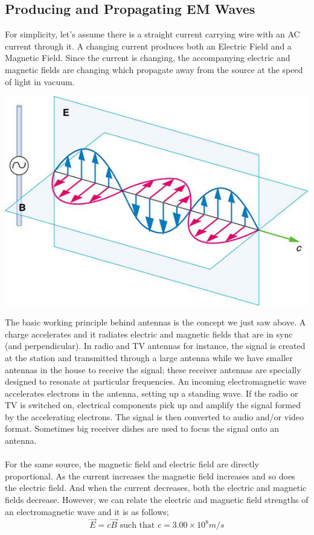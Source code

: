 \documentclass[11pt]{article}
\begin{document}
\subsection*{Producing and Propagating EM Waves}
For simplicity, let's assume there is a straight current carrying wire with an AC current through it. A changing current produces both an Electric Field and a Magnetic Field. Since the current is changing, the accompanying electric and magnetic fields are changing which propagate away from the source at the speed of light in vacuum.
\begin{center}
	\includegraphics[scale=0.8]{em_wave}
\end{center}
The basic working principle behind antennas is the concept we just saw above. A charge accelerates and it radiates electric and magnetic fields that are in sync (and perpendicular). In radio and TV antennas for instance, the signal is created at the station and transmitted through a large antenna while we have smaller antennas in the house to receive the signal; these receiver antennas are specially designed to resonate at particular frequencies. An incoming electromagnetic wave accelerates electrons in the antenna, setting up a standing wave. If the radio or TV is switched on, electrical components pick up and amplify the signal formed by the accelerating electrons. The signal is then converted to audio and/or video format. Sometimes big receiver dishes are used to focus the signal onto an antenna. \\ \\
For the same source, the magnetic field and electric field are directly proportional. As the current increases the magnetic field increases and so does the electric field. And when the current decreases, both the electric and magnetic fields decrease. However, we can relate the electric and magnetic field strengths of an electromagnetic wave and it is as follows;
$$\vec{E}=c\vec{B}\text{ such that }c=3.00\times10^8m/s$$  
\end{document}
